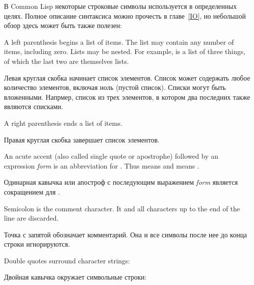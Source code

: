 В Common Lisp некоторые строковые символы используется в определенных целях. Полное
описание синтаксиса можно прочесть в главе~\ref{IO}, но небольшой обзор здесь
может быть также полезен:
\begin{indentdesc}{1.2pc}
\item[\cd{(}]
A left parenthesis begins a list of items.  The list may
contain any number of items, including zero.  Lists may be nested.
For example,  is a list of three things,
of which the last two are themselves lists.

\item[\cd{(}]
Левая круглая скобка начинает список элементов. Список может содержать любое
количество элементов, включая ноль (пустой список). Списки могут быть
вложенными. Напрмер,  список из трех элементов, в
котором два последних также являются списками.

\item[\cd{)}] A right parenthesis ends a list of items.

\item[\cd{)}] Правая круглая скобка завершает список элементов.

\item[\cd{\Xquote}] An acute accent (also called single
quote or apostrophe) followed by an expression \textit{form}
is an abbreviation for .  Thus  means
 and  means .

\item[\cd{\Xquote}] Одинарная кавычка или апостроф с последующим выражением {\it
form} является сокращением для . 

\item[\cd{;}] Semicolon is the comment character.  It and all
characters up to the end of the line are discarded.

\item[\cd{;}] Точка с запятой обозначает комментарий. Она и все символы после
нее до конца строки игнорируются.

\item[\cd{"}] Double quotes surround character strings: \\

\item[\cd{"}] Двойная кавычка окружает символьные строки: \\


\end{indentdesc}
